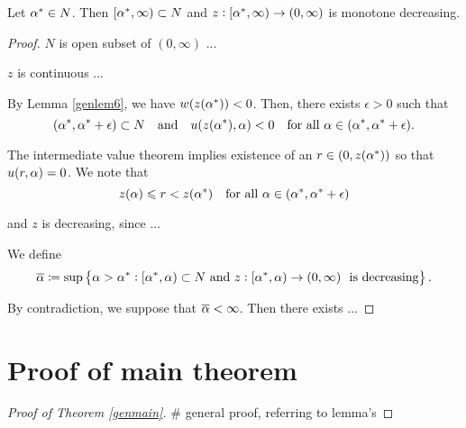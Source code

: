 \begin{lemma}\label{genlem8}
Let $\alpha^{*} \in N$. Then $\left[ \alpha^{*}, \infty \right) \subset N$ and $z : \left[
\alpha^{*}, \infty \right) \to (0, \infty)$ is monotone decreasing.
\end{lemma}
\begin{proof}
$N$ is open subset of $(0, \infty)$ ...

$z$ is continuous ...

By Lemma \ref{genlem6}, we have $w(z(\alpha^{*})) < 0$. Then, there exists $\epsilon >
0$ such that
\[ (\alpha^{*}, \alpha^{*} + \epsilon) \subset N\quad\text{and}\quad u(z(\alpha^{*}), \alpha) < 0\quad
\text{for all} ~ \alpha \in (\alpha^{*}, \alpha^{*} + \epsilon). \]

The intermediate value theorem implies existence of an $r \in (0, z(\alpha^{*}))$ so
that $u(r, \alpha) = 0$. We note that 
\[ z(\alpha) \leqslant r < z(\alpha^{*})\quad\text{for all} ~ \alpha \in (\alpha^{*}, \alpha^{*} + \epsilon) \]

and $z$ is decreasing, since ...

We define
\[ \overline{\alpha} \coloneqq \sup \left\{ \alpha > \alpha^{*} : \left[ \alpha^{*}, \alpha \right) \subset N ~
\text{and} ~ z : \left[ \alpha^{*}, \alpha \right) \to (0, \infty) ~ \text{ is decreasing}
\right\}. \]


By contradiction, we suppose that $\overline{\alpha} < \infty$. Then there exists ...
\end{proof}

\section{Proof of main theorem}
\begin{proof}[Proof of Theorem \ref{genmain}]
\# general proof, referring to lemma's
\end{proof}

